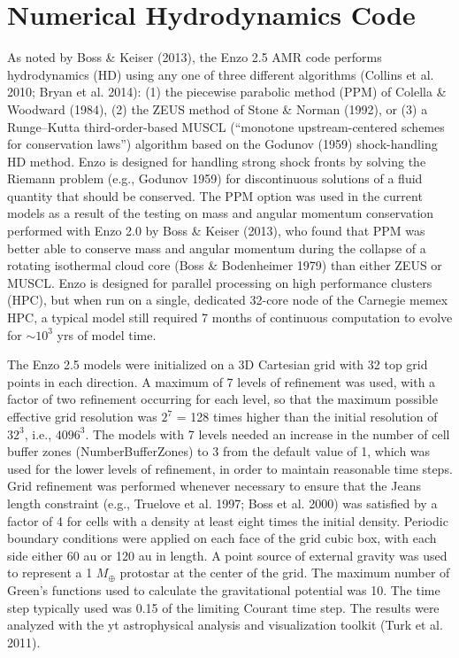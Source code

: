\documentclass[12pt,preprint]{aastex}
\begin{document}
\section{Numerical Hydrodynamics Code}

 As noted by Boss \& Keiser (2013), the Enzo 2.5 AMR code performs hydrodynamics (HD) using any one of three 
different algorithms (Collins et al. 2010; Bryan et al. 2014): 
(1) the piecewise parabolic method (PPM) of Colella \& Woodward (1984), (2) the ZEUS method of Stone \& Norman 
(1992), or (3) a Runge–Kutta third-order-based MUSCL (“monotone upstream-centered schemes for conservation laws”) 
algorithm based on the Godunov (1959) shock-handling HD method. Enzo is designed for handling strong shock fronts 
by solving the Riemann problem (e.g., Godunov 1959) for discontinuous solutions of a fluid quantity that should be 
conserved. The PPM option was used in the current models as a result of the testing on mass and angular momentum 
conservation performed with Enzo 2.0 by Boss \& Keiser (2013), who found that PPM was better able to conserve mass and
angular momentum during the collapse of a rotating isothermal cloud core (Boss \& Bodenheimer 1979) than
either ZEUS or MUSCL. Enzo is designed for parallel processing on high performance clusters (HPC), but when run on
a single, dedicated 32-core node of the Carnegie memex HPC, a typical model still required 7 months of continuous
computation to evolve for $\sim 10^3$ yrs of model time.

  The Enzo 2.5 models were initialized on a 3D Cartesian grid with 32 top grid points in each direction. 
A maximum of 7 levels of refinement was used, with a factor of two refinement occurring for each level, so 
that the maximum possible effective grid resolution was $2^7$ = 128 times higher than the initial resolution 
of $32^3$, i.e., $4096^3$. The models with 7 levels needed an increase in the number of cell buffer zones
(NumberBufferZones) to 3 from the default value of 1, which was used for the lower levels of refinement,
in order to maintain reasonable time steps. Grid refinement was performed whenever necessary to ensure that 
the Jeans length constraint (e.g., Truelove et al. 1997; Boss et al. 2000) was satisfied by a factor of 4 for cells
with a density at least eight times the initial density. Periodic boundary conditions 
were applied on each face of the grid cubic box, with each side either 60 au or 120 au in length.
A  point source of external gravity was used to represent a 1 $M_\oplus$ protostar at the center of the grid.
The maximum number of Green’s functions used to calculate the gravitational potential was 10. The 
time step typically used was 0.15 of the limiting Courant time step. The results were analyzed with the 
yt astrophysical analysis and visualization toolkit (Turk et al. 2011).
\end{document}
